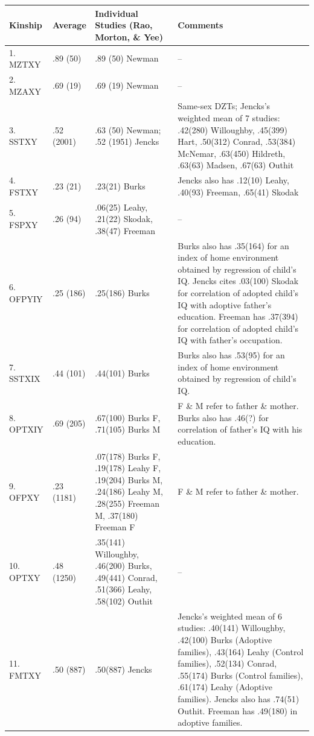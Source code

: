 ﻿\documentclass[12pt]{article}
\begin{document}
\begin{center}
\footnotesize
\begin{tabular}{l l l p{6.5cm}}
\hline
Kinship & Average & Individual Studies (Rao, Morton, \& Yee) & Comments \\
\hline
1. MZTXY & .89 (50) & .89 (50) Newman & -- \\
2. MZAXY & .69 (19) & .69 (19) Newman & -- \\
3. SSTXY & .52 (2001) & .63 (50) Newman; .52 (1951) Jencks & Same-sex DZTs; Jencks's weighted mean of 7 studies: .42(280) Willoughby, .45(399) Hart, .50(312) Conrad, .53(384) McNemar, .63(450) Hildreth, .63(63) Madsen, .67(63) Outhit \\
4. FSTXY & .23 (21) & .23(21) Burks & Jencks also has .12(10) Leahy, .40(93) Freeman, .65(41) Skodak \\
5. FSPXY & .26 (94) & .06(25) Leahy, .21(22) Skodak, .38(47) Freeman & -- \\
6. OFPYIY & .25 (186) & .25(186) Burks & Burks also has .35(164) for an index of home environment obtained by regression of child's IQ. Jencks cites .03(100) Skodak for correlation of adopted child's IQ with adoptive father's education. Freeman has .37(394) for correlation of adopted child's IQ with father's occupation. \\
7. SSTXIX & .44 (101) & .44(101) Burks & Burks also has .53(95) for an index of home environment obtained by regression of child's IQ. \\
8. OPTXIY & .69 (205) & .67(100) Burks F, .71(105) Burks M & F \& M refer to father \& mother. Burks also has .46(?) for correlation of father's IQ with his education. \\
9. OFPXY & .23 (1181) & .07(178) Burks F, .19(178) Leahy F, .19(204) Burks M, .24(186) Leahy M, .28(255) Freeman M, .37(180) Freeman F & F \& M refer to father \& mother. \\
10. OPTXY & .48 (1250) & .35(141) Willoughby, .46(200) Burks, .49(441) Conrad, .51(366) Leahy, .58(102) Outhit & -- \\
11. FMTXY & .50 (887) & .50(887) Jencks & Jencks's weighted mean of 6 studies: .40(141) Willoughby, .42(100) Burks (Adoptive families), .43(164) Leahy (Control families), .52(134) Conrad, .55(174) Burks (Control families), .61(174) Leahy (Adoptive families). Jencks also has .74(51) Outhit. Freeman has .49(180) in adoptive families. \\
\hline
\end{tabular}
\end{center}
\end{document}
